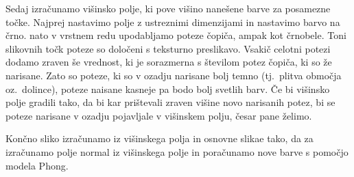 Sedaj izračunamo višinsko polje, ki pove višino nanešene barve za posamezne točke. Najprej nastavimo polje z ustreznimi dimenzijami in nastavimo barvo na črno. nato v vrstnem redu upodabljamo poteze čopiča, ampak kot črnobele. Toni slikovnih točk poteze so določeni s teksturno preslikavo. Vsakič celotni potezi dodamo zraven še vrednost, ki je sorazmerna s številom potez čopiča, ki so že narisane. Zato so poteze, ki so v ozadju narisane bolj temno (tj.\ plitva območja oz.\ dolince), poteze naisane kasneje pa bodo bolj svetlih barv. Če bi višinsko polje gradili tako, da bi kar prištevali zraven višine novo narisanih potez, bi se poteze narisane v ozadju pojavljale v višinskem polju, česar pane želimo.

Končno sliko izračunamo iz višinskega polja in osnovne slikae tako, da za izračunamo polje normal iz višinskega polje in poračunamo nove barve s pomočjo modela Phong.
%

